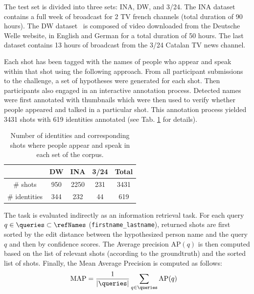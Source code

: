  The test set is divided into three sets: INA, DW, and 3/24. The INA dataset contains a full week of broadcast for 2 TV french channels (total duration of 90 hours). The DW dataset~\cite{EUMSSI} is composed of video downloaded from the Deutsche Welle website, in English and German for a total duration of 50 hours. The last dataset contains 13 hours of broadcast from the 3/24 Catalan TV news channel. 

Each shot has been tagged with the names of people who appear and speak within that shot using the following approach.
%
From all participant submissions to the challenge, a set of hypotheses were generated for each shot. 
Then participants also engaged in an interactive annotation process.
Detected names were first annotated with  thumbnails which were then used to verify whether people appeared and talked in a particular shot. 
This annotation process yielded 3431 shots with 619 identities annotated (see Tab. \ref{tab:stats} for details).

\begin{table}[tb]
\centering
\caption{Number of identities and corresponding shots where people appear and speak in each set of the corpus.}
\vspace*{-2mm}
\begin{tabular}{c|c|c|c|c|}
\cline{2-5}
    						   		& DW  	& INA 	& 3/24  & Total\\ \hline
 \multicolumn{1}{|c|}{\# shots} 		& 950	& 2250  & 231 & 3431\\ \hline

 \multicolumn{1}{|c|}{\# identities} 	& 344	& 232   & 44 & 619 \\ \hline
								
\end{tabular}
%
\vspace*{-5mm}
\label{tab:stats}
\end{table}



 The task is evaluated indirectly as an information retrieval task. %
%
For each query $q \in \queries \subset \refNames$ (\texttt{first\-name\_lastname}), returned shots are first sorted by the edit distance between the hypothesized person name and the query $q$ and then by confidence scores.
The Average precision $\text{AP}(q)$ is then computed based on the list of relevant shots (according to the groundtruth) and the sorted list of shots. Finally, the Mean Average Precision is computed as follows:
\begin{align}
            \text{MAP} & = \frac{1}{|\queries|} \sum_{q \in \queries} \text{AP}(q) \nonumber
\end{align}

